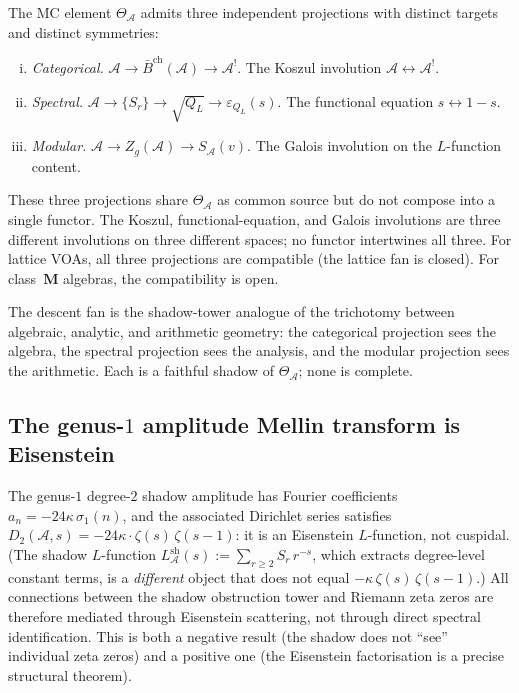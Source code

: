 \documentclass[11pt,reqno]{amsart}
\theoremstyle{definition}
\theoremstyle{remark}
\newcommand{\cA}{\mathcal{A}}
\newcommand{\barB}{\bar{B}}
\numberwithin{equation}{section}
\begin{document}
The MC element $\Theta_\cA$ admits three independent
projections with distinct targets and distinct symmetries:
\begin{enumerate}[(i)]
\item \emph{Categorical.}
 $\cA \to \barB^{\mathrm{ch}}(\cA) \to \cA^!$.
 The Koszul involution $\cA \leftrightarrow \cA^!$.
\item \emph{Spectral.}
 $\cA \to \{S_r\} \to \sqrt{Q_L} \to \varepsilon_{Q_L}(s)$.
 The functional equation $s \leftrightarrow 1 - s$.
\item \emph{Modular.}
 $\cA \to Z_g(\cA) \to S_\cA(v)$.
 The Galois involution on the $L$-function content.
\end{enumerate}
These three projections share $\Theta_\cA$ as common source
but do not compose into a single functor. The Koszul,
functional-equation, and Galois involutions are three different
involutions on three different spaces; no functor intertwines
all three. For lattice VOAs, all three projections are
compatible (the lattice fan is closed). For
class~$\mathbf{M}$ algebras, the compatibility is open.

The descent fan is the shadow-tower analogue of the
trichotomy between algebraic, analytic, and arithmetic
geometry: the categorical projection sees the algebra, the
spectral projection sees the analysis, and the modular
projection sees the arithmetic. Each is a faithful shadow of
$\Theta_\cA$; none is complete.

\subsection{The genus-$1$ amplitude Mellin transform is Eisenstein}
\label{subsec:eisenstein-outlook}

The genus-$1$ degree-$2$ shadow amplitude has Fourier
coefficients $a_n = -24\kappa\,\sigma_1(n)$, and the
associated Dirichlet series satisfies
$D_2(\cA, s) = -24\kappa \cdot \zeta(s)\,\zeta(s{-}1)$:
it is an Eisenstein $L$-function, not cuspidal. (The shadow
$L$-function $L_\cA^{\mathrm{sh}}(s) := \sum_{r \geq 2}
S_r\,r^{-s}$, which extracts degree-level constant terms, is
a \emph{different} object that does not equal
$-\kappa\,\zeta(s)\,\zeta(s{-}1)$.)
All connections between the shadow obstruction tower
and Riemann zeta zeros are therefore mediated through
Eisenstein scattering, not through direct spectral
identification. This is both a negative result (the shadow
does not ``see'' individual zeta zeros) and a positive one
(the Eisenstein factorisation is a precise structural theorem).
\end{document}
